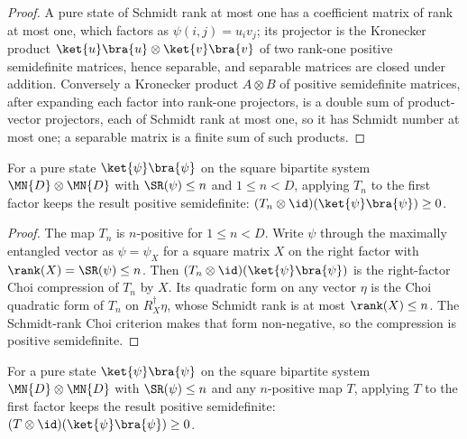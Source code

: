 \begin{proof}
    \leanok
    A pure state of Schmidt rank at most one has a coefficient matrix of rank at most
    one, which factors as $\psi(i,j)=u_i v_j$; its projector is the Kronecker product
    $\ket{u}\bra{u}\otimes\ket{v}\bra{v}$ of two rank-one positive semidefinite
    matrices, hence separable, and separable matrices are closed under addition.
    Conversely a Kronecker product $A\otimes B$ of positive semidefinite matrices,
    after expanding each factor into rank-one projectors, is a double sum of
    product-vector projectors, each of Schmidt rank at most one, so it has Schmidt
    number at most one; a separable matrix is a finite sum of such products.
\end{proof}

\begin{theorem}
    \label{thm:tensor_map_id_t_eta_posSemidef_pure}
    \leanok
    For a pure state $\ket{\psi}\bra{\psi}$ on the square bipartite system
    $\MN{D}\otimes\MN{D}$ with $\SR(\psi)\le n$ and
    $1\le n<D$, applying $T_n$ to the first factor keeps the result positive
    semidefinite: $(T_n\otimes\id)(\ket{\psi}\bra{\psi})\ge 0$.
\end{theorem}

\begin{proof}
    \leanok
    The map $T_n$ is $n$-positive for $1\le n<D$. Write $\psi$ through the maximally
    entangled vector as $\psi=\psi_X$ for a square matrix $X$ on the right factor with
    $\rank(X)=\SR(\psi)\le n$. Then
    $(T_n\otimes\id)(\ket{\psi}\bra{\psi})$ is the right-factor Choi compression of
    $T_n$ by $X$. Its quadratic form on any vector $\eta$ is the Choi quadratic form
    of $T_n$ on $R_X^\dagger\eta$, whose Schmidt rank is at most
    $\rank(X)\le n$. The Schmidt-rank Choi criterion makes that form
    non-negative, so the compression is positive semidefinite.
\end{proof}

\begin{theorem}
    \label{thm:tensor_map_id_posSemidef_pure}
    \leanok
    For a pure state $\ket{\psi}\bra{\psi}$ on the square bipartite system
    $\MN{D}\otimes\MN{D}$ with $\SR(\psi)\le n$ and any $n$-positive map
    $T$, applying $T$ to the first factor keeps the result positive semidefinite:
    $(T\otimes\id)(\ket{\psi}\bra{\psi})\ge 0$.
\end{theorem}

